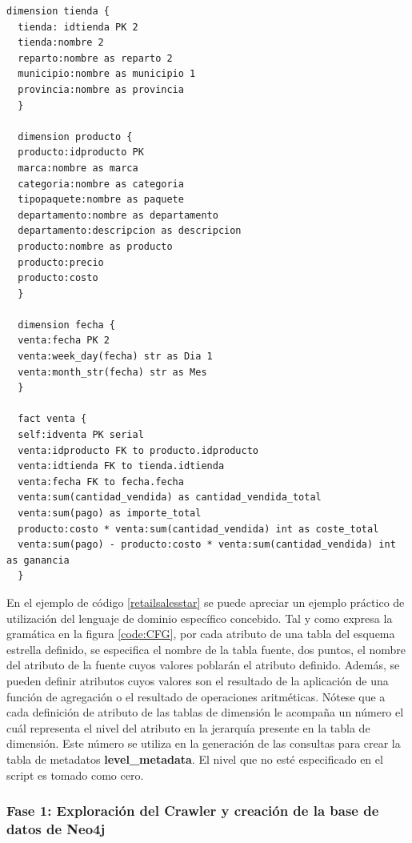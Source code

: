 \begin{lstlisting}[label={retailsalesstar}, caption={Definici\'on del esquema estrella del almacén de datos asociado al escenario ventas minoristas}]
  dimension tienda {
  tienda: idtienda PK 2
  tienda:nombre 2
  reparto:nombre as reparto 2
  municipio:nombre as municipio 1
  provincia:nombre as provincia 
  }

  dimension producto {
  producto:idproducto PK
  marca:nombre as marca
  categoria:nombre as categoria
  tipopaquete:nombre as paquete
  departamento:nombre as departamento
  departamento:descripcion as descripcion
  producto:nombre as producto
  producto:precio
  producto:costo
  }

  dimension fecha {
  venta:fecha PK 2
  venta:week_day(fecha) str as Dia 1
  venta:month_str(fecha) str as Mes 
  }

  fact venta {
  self:idventa PK serial
  venta:idproducto FK to producto.idproducto 
  venta:idtienda FK to tienda.idtienda
  venta:fecha FK to fecha.fecha
  venta:sum(cantidad_vendida) as cantidad_vendida_total
  venta:sum(pago) as importe_total
  producto:costo * venta:sum(cantidad_vendida) int as coste_total
  venta:sum(pago) - producto:costo * venta:sum(cantidad_vendida) int as ganancia 
  }
\end{lstlisting}

En el ejemplo de c\'odigo \ref{retailsalesstar} se puede apreciar un ejemplo pr\'actico de utilización 
del lenguaje de dominio espec\'ifico concebido. Tal y como expresa la gramática en la figura \ref{code:CFG}, 
por cada atributo de una tabla del esquema estrella definido, se especifica el nombre de la tabla 
fuente, dos puntos, el nombre del atributo de la fuente cuyos valores poblar\'an el atributo definido. 
Además, se pueden definir atributos cuyos valores son el resultado de la aplicación de una funci\'on de agregación 
o el resultado de operaciones aritméticas. Nótese que a cada definición de atributo de las tablas de 
dimensi\'on le acompaña un n\'umero el 
cu\'al representa el nivel del atributo en la jerarquía presente en la tabla de dimensi\'on. Este n\'umero 
se utiliza en la generación de las consultas para crear la tabla de metadatos \textbf{level\_metadata}. 
El nivel que no est\'e especificado en el script es tomado como cero. 

\subsubsection{Fase 1: Exploraci\'on del Crawler y creaci\'on de la base de datos de Neo4j}

